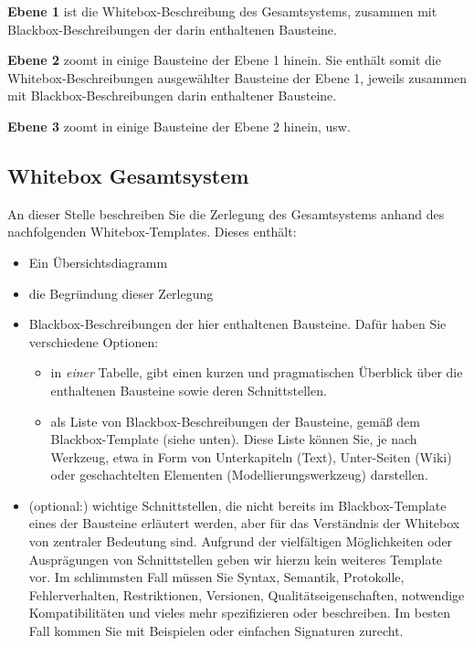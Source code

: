 \documentclass[]{article}
\begin{document}
\textbf{Ebene 1} ist die Whitebox-Beschreibung des Gesamtsystems,
zusammen mit Blackbox-Beschreibungen der darin enthaltenen Bausteine.

\textbf{Ebene 2} zoomt in einige Bausteine der Ebene 1 hinein. Sie
enthält somit die Whitebox-Beschreibungen ausgewählter Bausteine der
Ebene 1, jeweils zusammen mit Blackbox-Beschreibungen darin enthaltener
Bausteine.

\textbf{Ebene 3} zoomt in einige Bausteine der Ebene 2 hinein, usw.

\hypertarget{_whitebox_gesamtsystem}{%
\subsection{Whitebox Gesamtsystem}\label{_whitebox_gesamtsystem}}

An dieser Stelle beschreiben Sie die Zerlegung des Gesamtsystems anhand
des nachfolgenden Whitebox-Templates. Dieses enthält:

\begin{itemize}
\item
  Ein Übersichtsdiagramm
\item
  die Begründung dieser Zerlegung
\item
  Blackbox-Beschreibungen der hier enthaltenen Bausteine. Dafür haben
  Sie verschiedene Optionen:

  \begin{itemize}
  \item
    in \emph{einer} Tabelle, gibt einen kurzen und pragmatischen
    Überblick über die enthaltenen Bausteine sowie deren Schnittstellen.
  \item
    als Liste von Blackbox-Beschreibungen der Bausteine, gemäß dem
    Blackbox-Template (siehe unten). Diese Liste können Sie, je nach
    Werkzeug, etwa in Form von Unterkapiteln (Text), Unter-Seiten (Wiki)
    oder geschachtelten Elementen (Modellierungswerkzeug) darstellen.
  \end{itemize}
\item
  (optional:) wichtige Schnittstellen, die nicht bereits im
  Blackbox-Template eines der Bausteine erläutert werden, aber für das
  Verständnis der Whitebox von zentraler Bedeutung sind. Aufgrund der
  vielfältigen Möglichkeiten oder Ausprägungen von Schnittstellen geben
  wir hierzu kein weiteres Template vor. Im schlimmsten Fall müssen Sie
  Syntax, Semantik, Protokolle, Fehlerverhalten, Restriktionen,
  Versionen, Qualitätseigenschaften, notwendige Kompatibilitäten und
  vieles mehr spezifizieren oder beschreiben. Im besten Fall kommen Sie
  mit Beispielen oder einfachen Signaturen zurecht.
\end{itemize}
\end{document}
